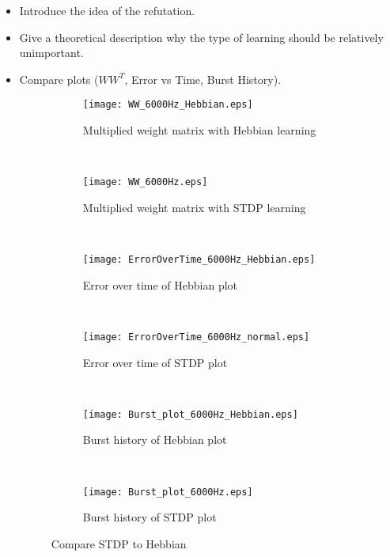 \begin{itemize}
\item Introduce the idea of the refutation. 
\item Give a theoretical description why the type of learning should be relatively unimportant.
\item Compare plots (\(WW^T\), Error vs Time, Burst History).

\begin{figure}[H]
\centering
\begin{subfigure}[b]{0.49\textwidth}
\texttt{[image: WW\_6000Hz\_Hebbian.eps]}
\caption{Multiplied weight matrix with Hebbian learning}
\label{Compare: WW_Hebbian}
\end{subfigure}
\,
\begin{subfigure}[b]{0.49\textwidth}
\texttt{[image: WW\_6000Hz.eps]}
\caption{Multiplied weight matrix with STDP learning}
\label{Compare: WW_STDP}
\end{subfigure}
\\
\begin{subfigure}[b]{0.49\textwidth}
\texttt{[image: ErrorOverTime\_6000Hz\_Hebbian.eps]}
\caption{Error over time of Hebbian plot}
\label{Compare: EoT_Hebbian}
\end{subfigure}
\,
\begin{subfigure}[b]{0.49\textwidth}
\texttt{[image: ErrorOverTime\_6000Hz\_normal.eps]}
\caption{Error over time of STDP plot}
\label{Compare: EoT_STDP}
\end{subfigure}
\\
\begin{subfigure}[b]{0.49\textwidth}
\texttt{[image: Burst\_plot\_6000Hz\_Hebbian.eps]}
\caption{Burst history of Hebbian plot}
\label{Compare: BH_Hebbian}
\end{subfigure}
\,
\begin{subfigure}[b]{0.49\textwidth}
\texttt{[image: Burst\_plot\_6000Hz.eps]}
\caption{Burst history of STDP plot}
\label{Compare: BH_STDP}
\end{subfigure}
\caption{Compare STDP to Hebbian}
\label{Compare}
\end{figure}
\end{itemize}